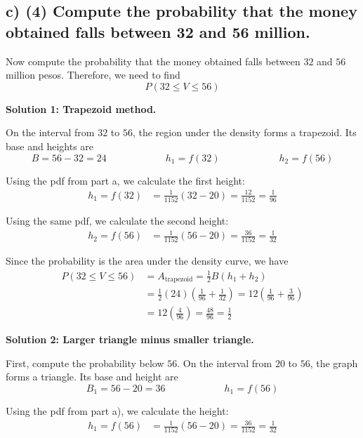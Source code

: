 	\subsection*{c) \textbf{(4)} Compute the probability that the money obtained falls between 32 and 56 million.}
	\label{subsec:online-coffee-sales-investment-c1-c}
	Now compute the probability that the money obtained falls between $32$ and $56$ million pesos. Therefore, we need to find
	\[
	P(32\le V\le 56)
	\]
	
	\textbf{Solution 1: Trapezoid method.}
	
	On the interval from $32$ to $56$, the region under the density forms a trapezoid. Its base and heights are
	\[
	B=56-32=24
	\qquad \qquad \qquad
	h_1=f(32)
	\qquad \qquad \qquad
	h_2=f(56)
	\]
	
	Using the pdf from part a, we calculate the first height:
	\[
	\begin{aligned}
		h_1=f(32)
		&=\frac{1}{1152}(32-20)
		=\frac{12}{1152}
		=\frac{1}{96}
	\end{aligned}
	\]
	
	Using the same pdf, we calculate the second height:
	\[
	\begin{aligned}
		h_2=f(56)
		&=\frac{1}{1152}(56-20)
		=\frac{36}{1152}
		=\frac{1}{32}
	\end{aligned}
	\]
	
	Since the probability is the area under the density curve, we have
	\[
	\begin{aligned}
		P(32\le V\le 56)
		&=A_{\text{trapezoid}}
		=\frac{1}{2}B(h_1+h_2)\\
		&=\frac{1}{2}(24)\left(\frac{1}{96}+\frac{1}{32}\right)
		=12\left(\frac{1}{96}+\frac{3}{96}\right)\\
		&=12\left(\frac{4}{96}\right)
		=\frac{48}{96}
		=\frac{1}{2}
	\end{aligned}
	\]
	
	\textbf{Solution 2: Larger triangle minus smaller triangle.}
	
	First, compute the probability below $56$. On the interval from $20$ to $56$, the graph forms a triangle. Its base and height are
	\[
	B_1=56-20=36
	\qquad \qquad \qquad
	h_1=f(56)
	\]
	
	Using the pdf from part a), we calculate the height:
	\[
	\begin{aligned}
		h_1=f(56)
		&=\frac{1}{1152}(56-20)
		=\frac{36}{1152}
		=\frac{1}{32}
	\end{aligned}
	\]
	
